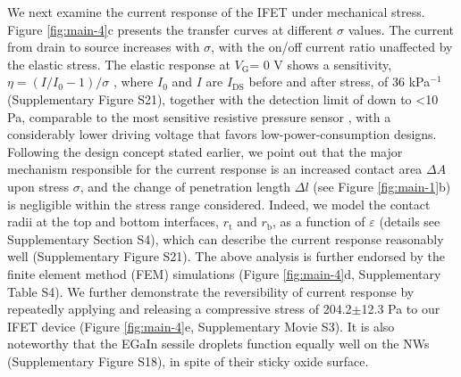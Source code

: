 \documentclass[journal=nalefd,manuscript=letter,email=true,hyperref=true,keywords=true]{achemso}
\begin{document}
We next examine the current response of the IFET under mechanical
stress. Figure \ref{fig:main-4}c presents the transfer curves at
different \(\sigma\) values. The current from drain to source
increases with \(\sigma\), with the on/off current ratio unaffected by
the elastic stress. The elastic response at \(V_{\mathrm{G}}\)= 0 V
shows a sensitivity, \(\eta = (I/I_{0} - 1) / \sigma\) , where
\(I_{0}\) and \(I\) are \(I_{\mathrm{DS}}\) before and after stress,
of 36 kPa\(^{-1}\) (Supplementary Figure S21), together with the
detection limit of down to \textless{}10 Pa, comparable to the most
sensitive resistive pressure sensor
\cite{Mannsfeld_2010,Pang_2012,Pan_2014,Zang_2015}, with a
considerably lower driving voltage that favors low-power-consumption
designs. Following the design concept stated earlier, we point out
that the major mechanism responsible for the current response is an
increased contact area \(\Delta A\) upon stress \(\sigma\), and the
change of penetration length \(\Delta l\) (see Figure \ref{fig:main-1}b)
is negligible within the stress range considered. Indeed, we model
the contact radii at the top and bottom interfaces, \(r_{\mathrm{t}}\)
and \(r_{\mathrm{b}}\), as a function of \(\varepsilon\) (details see
Supplementary Section S4), which can describe the current response
reasonably well (Supplementary Figure S21). The above analysis is
further endorsed by the finite element method (FEM) simulations
(Figure \ref{fig:main-4}d, Supplementary Table S4).  We further
demonstrate the reversibility of current response by repeatedly
applying and releasing a compressive stress of 204.2\(\pm\)12.3 Pa
to our IFET device (Figure \ref{fig:main-4}e, Supplementary Movie
S3). It is also noteworthy that the EGaIn sessile droplets function
equally well on the NWs (Supplementary Figure S18), in spite of
their sticky oxide surface.
\end{document}
